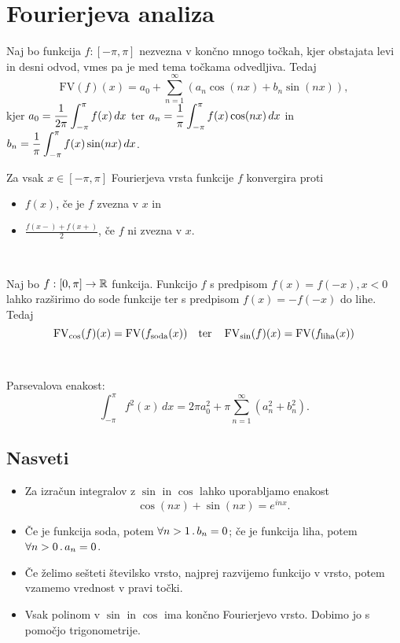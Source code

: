 \section{Fourierjeva analiza}

Naj bo funkcija \(f: [-\pi, \pi]\) nezvezna v končno mnogo točkah, kjer obstajata levi in desni odvod, vmes pa je med tema točkama odvedljiva. Tedaj 
\[
    \text{FV}(f)(x) = a_0 + \sum_{n=1}^{\infty}(a_n \cos(nx) + b_n \sin(nx)),
\]
kjer \(\displaystyle a_0 = \frac{1}{2\pi} \int_{-\pi}^{\pi} f(x) \, dx\) ter \(\displaystyle a_n = \frac{1}{\pi} \int_{-\pi}^{\pi} f(x)  \cos(nx) \, dx\) in \(\displaystyle b_n = \frac{1}{\pi} \int_{-\pi}^{\pi} f(x)  \sin(nx) \, dx\).

Za vsak \(x \in [-\pi, \pi]\) Fourierjeva vrsta funkcije \(f\) konvergira proti 
\begin{itemize}
    \item \(f(x)\), če je \(f\) zvezna v \(x\) in 
    \item \(\frac{f(x-) + f(x+)}{2}\), če \(f\) ni zvezna v \(x\).
\end{itemize}

\ 

Naj bo \(f: [0, \pi] \to \mathbb{R}\) funkcija. Funkcijo \(f\) s predpisom \(f(x) = f(-x), x < 0\) lahko razširimo do sode funkcije ter s predpisom \(f(x) = -f(-x)\) do lihe. Tedaj 
\[
    \operatorname{FV}_{\cos}(f)(x) = \operatorname{FV}(f_{\text{soda}}(x)) \quad \text{ter} \quad \operatorname{FV}_{\sin}(f)(x) = \text{FV}(f_{\text{liha}}(x))
\]

\

Parsevalova enakost:
\[
    \int_{-\pi}^{\pi} f^2(x) \, dx = 2\pi a_0^2 + \pi \sum_{n=1}^{\infty} (a_n^2 + b_n^2).
\]

\subsection{Nasveti}
\begin{itemize}
    \item Za izračun integralov z \(\sin\) in \(\cos\) lahko uporabljamo enakost 
    \[
        \cos(nx) + \sin(nx) = e^{inx}.
    \]
    \item Če je funkcija soda, potem \(\forall n > 1 \,.\, b_n = 0\); če je funkcija liha, potem \(\forall n > 0 \,.\, a_n = 0\).
    \item Če želimo sešteti številsko vrsto, najprej razvijemo funkcijo v vrsto, potem vzamemo vrednost v pravi točki.
    \item Vsak polinom v \(\sin\) in \(\cos\) ima končno Fourierjevo vrsto. Dobimo jo s pomočjo trigonometrije.
\end{itemize}